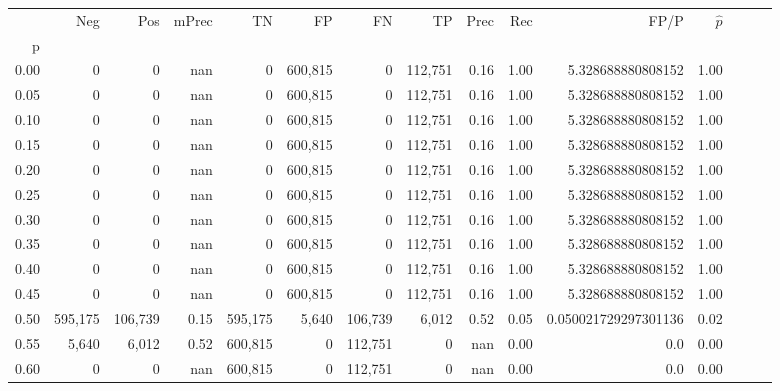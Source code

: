 \begin{tabular}{rrrrrrrrrrrrrrr}
\toprule
{} &      Neg &      Pos & mPrec &       TN &       FP &       FN &       TP &  Prec &   Rec &                  FP/P & $\hat{p}$ \\
p    &          &          &       &          &          &          &          &       &       &                       &           \\
\midrule
0.00 &        0 &        0 &   nan &        0 &  600,815 &        0 &  112,751 &  0.16 &  1.00 &     5.328688880808152 &      1.00 \\
0.05 &        0 &        0 &   nan &        0 &  600,815 &        0 &  112,751 &  0.16 &  1.00 &     5.328688880808152 &      1.00 \\
0.10 &        0 &        0 &   nan &        0 &  600,815 &        0 &  112,751 &  0.16 &  1.00 &     5.328688880808152 &      1.00 \\
0.15 &        0 &        0 &   nan &        0 &  600,815 &        0 &  112,751 &  0.16 &  1.00 &     5.328688880808152 &      1.00 \\
0.20 &        0 &        0 &   nan &        0 &  600,815 &        0 &  112,751 &  0.16 &  1.00 &     5.328688880808152 &      1.00 \\
0.25 &        0 &        0 &   nan &        0 &  600,815 &        0 &  112,751 &  0.16 &  1.00 &     5.328688880808152 &      1.00 \\
0.30 &        0 &        0 &   nan &        0 &  600,815 &        0 &  112,751 &  0.16 &  1.00 &     5.328688880808152 &      1.00 \\
0.35 &        0 &        0 &   nan &        0 &  600,815 &        0 &  112,751 &  0.16 &  1.00 &     5.328688880808152 &      1.00 \\
0.40 &        0 &        0 &   nan &        0 &  600,815 &        0 &  112,751 &  0.16 &  1.00 &     5.328688880808152 &      1.00 \\
0.45 &        0 &        0 &   nan &        0 &  600,815 &        0 &  112,751 &  0.16 &  1.00 &     5.328688880808152 &      1.00 \\
0.50 &  595,175 &  106,739 &  0.15 &  595,175 &    5,640 &  106,739 &    6,012 &  0.52 &  0.05 &  0.050021729297301136 &      0.02 \\
0.55 &    5,640 &    6,012 &  0.52 &  600,815 &        0 &  112,751 &        0 &   nan &  0.00 &                   0.0 &      0.00 \\
0.60 &        0 &        0 &   nan &  600,815 &        0 &  112,751 &        0 &   nan &  0.00 &                   0.0 &      0.00 \\

\end{tabular}

